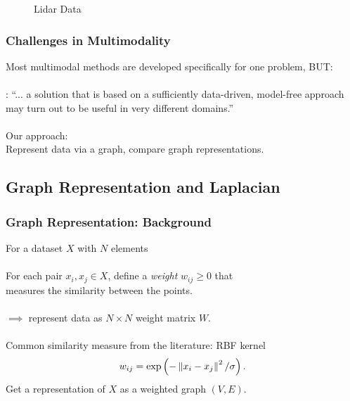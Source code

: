 \documentclass{beamer}
\begin{document}
\begin{frame}
\begin{figure}
\begin{minipage}[b]{0.40\linewidth}
      \caption{Lidar Data}
    \end{minipage}
    \hfill
  \end{figure}
\end{frame}

\begin{frame}
  \frametitle{Challenges in Multimodality}
  Most multimodal methods are developed specifically for one problem, BUT: \\~\\
  \cite{Lahat2015}: ``... a solution that is based on a sufficiently data-driven, model-free approach may turn out to be useful in very different domains.''\\~\\
  Our approach: \\Represent data via a graph, compare graph representations.
\end{frame}



\subsection{Graph Representation and Laplacian}
\begin{frame}
  \frametitle{Graph Representation: Background}
  For a dataset $X$ with $N$ elements \\~\\
  \hspace*{20pt} For each pair $x_i,x_j\in X$, define a \emph{weight} $w_{ij}\geq 0$ that\\  \hspace*{20pt} measures the similarity between the points. \\~\\
  \hspace*{20pt} $\implies$ represent data as $N \times N$ weight matrix $W$. \\~\\
  \hspace*{20pt} Common similarity measure from the literature: RBF kernel
  \[w_{ij} = \text{exp}\left(-\left\lVert x_i - x_j\right\rVert^2 / \sigma \right).\]
  Get a representation of $X$ as a weighted graph $(V,E)$.
\end{frame}
  
\end{document}
